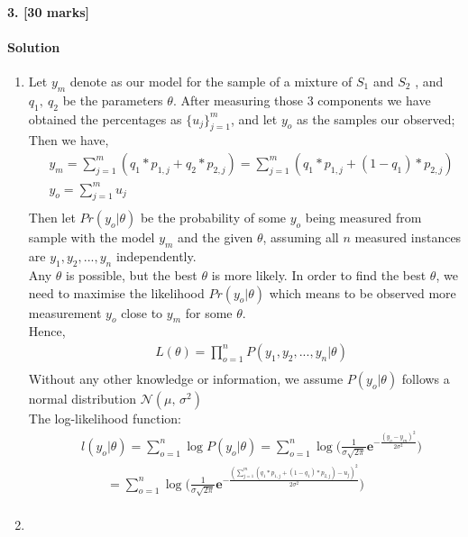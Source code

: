 \documentclass[a4paper]{scrartcl}
\begin{document}
\paragraph{3. [30 marks]}
\label{sec:Question 3}
\paragraph{Solution}
\begin{enumerate}[label=(\arabic*)]
  \item
  Let $y_m$ denote as our model for the sample of a mixture of $S_1$ and $S_2$ , and $q_1,\ q_2$ be the parameters $\theta$. After measuring those 3 components we have obtained the percentages as ${\{u_j\}_{j=1}^{m}}$, and let  $y_o$ as the samples our observed;
  Then we have,
  \begin{align*}
    &\ y_m = \sum_{j=1}^{m} (q_1* p_{1,j} + q_2* p_{2,j})= \sum_{j=1}^{m} (q_1* p_{1,j} + (1-q_1)* p_{2,j})\\ &\
     y_o = \sum_{j=1}^{m} u_j\\ &\
  \end{align*}
  Then let $Pr(y_o|\theta)$ be the probability of some $y_o$ being measured from sample with the model $y_m$ and the given $\theta$, assuming all $n$ measured instances are $y_1,y_2,...,y_n$ independently. \\
  Any $\theta$ is possible, but the best $\theta$ is more likely. In order to find the best $\theta$, we need to maximise the likelihood $Pr(y_o|\theta)$ which means to be observed more measurement $y_o$ close to $y_m$ for some $\theta$.\\Hence,
  \begin{align*}
   &\ L(\theta)=\prod_{o=1}^{n}P(y_1,y_2,...,y_n|\theta)\\ 
  \end{align*}
  Without any other knowledge or information, we assume $P(y_o|\theta)$ follows a normal distribution $\mathcal{N}(\mu,\,\sigma^{2})$
 \\
  The log-likelihood function:\\ 
  \begin{align*}
   &\ l(y_o|\theta)=\sum_{o=1}^{n}\log{P(y_o|\theta)}=\sum_{o=1}^{n}\log{\bigg( \frac{1}{\sigma \sqrt {2\pi}} \textbf{e}^{- \frac{(y_o-y_m)^2}{2\sigma^2}}\bigg)}\\ 
   &\ \qquad=\sum_{o=1}^{n}\log{\bigg(\frac{1}{\sigma \sqrt {2\pi}} \textbf{e}^{- \frac{( \sum_{j=1}^{m} (q_1* p_{1,j} + (1-q_1)* p_{2,j}) - u_j)^2}{2\sigma^2}} \bigg)}\\ &\
  \end{align*}
  \item
\end{enumerate}
\end{document}
